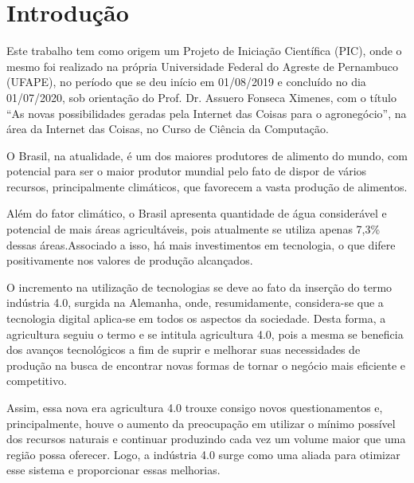\documentclass[eso]{bcc}
\begin{document}
\renewcommand\contentsname{\centerline{Sumário}}
\renewcommand\listfigurename{\centerline{Lista de Figuras}}

\tableofcontents

\listoffigures
{}


\newcommand\avisoPIC{
Este trabalho tem como origem um Projeto de Iniciação Científica (PIC), 
onde o mesmo foi realizado na própria Universidade Federal do Agreste de Pernambuco (UFAPE), 
no período que se deu início em 01/08/2019 e concluído no dia 01/07/2020, 
sob orientação do Prof\@. Dr\@. Assuero Fonseca Ximenes, com o título ``As novas 
possibilidades geradas pela Internet das Coisas para o agronegócio'', 
na área da Internet das Coisas, no Curso de Ciência da Computação.
}


\inicio\chapter{Introdução}

\avisoPIC{}

O Brasil, na atualidade, é um dos maiores produtores de alimento do mundo, com potencial para 
ser o maior produtor mundial pelo fato de dispor de vários recursos, principalmente climáticos, 
que favorecem a vasta produção de alimentos.

Além do fator climático, o Brasil apresenta quantidade de água considerável e potencial de 
mais áreas agricultáveis, pois atualmente se utiliza apenas 7,3\% dessas áreas.Associado a isso, 
há mais investimentos em tecnologia, o que difere positivamente nos valores de produção alcançados.

O incremento na utilização de tecnologias se deve ao fato da inserção do termo indústria 4.0, 
surgida na Alemanha, onde, resumidamente, considera-se que a tecnologia digital aplica-se em todos 
os aspectos da sociedade. Desta forma, a agricultura seguiu o termo e se intitula agricultura 4.0, 
pois a mesma se beneficia dos avanços tecnológicos a fim de suprir e melhorar suas necessidades 
de produção na busca de encontrar novas formas de tornar o negócio mais eficiente e competitivo.

Assim, essa nova era agricultura 4.0 trouxe consigo novos questionamentos e, principalmente, 
houve o aumento da preocupação em utilizar o mínimo possível dos recursos naturais e continuar 
produzindo cada vez um volume maior que uma região possa oferecer. Logo, a indústria 4.0 surge 
como uma aliada para otimizar esse sistema e proporcionar essas melhorias.
\end{document}
